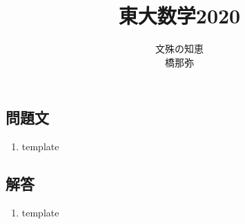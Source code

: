 \documentclass[dvipdfmx,titlepage, 11pt, a4paper]{jsarticle}%
\title{\Huge 東大数学2020\\[10mm]}
\author{{\LARGE 文殊の知恵}\\[1mm]\LARGE \CID{8705}橋那弥}
\date{}
\begin{document}
\maketitle
\tableofcontents %
\newpage
\setcounter{tocdepth}{3}%
\section{}%
\subsection{問題文}
\begin{enumerate}[(1)]
  \item template
\end{enumerate}
\newpage
\subsection{解答}
\begin{enumerate}[(1)]
  \item template
\end{enumerate}
\end{document}
